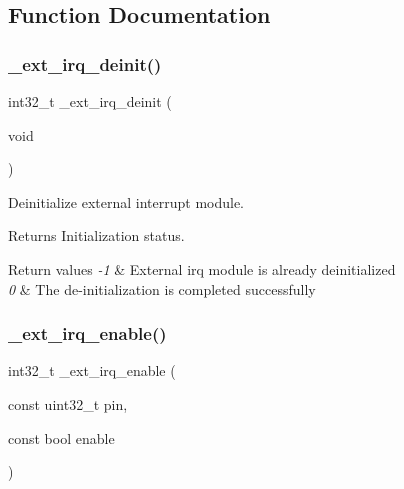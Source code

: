 \subsection{Function Documentation}
\mbox{\label{group___h_p_l_gad29f685cb658b260303c55fb7a88cdb0}} 
\subsubsection{\texorpdfstring{\+\_\+ext\+\_\+irq\+\_\+deinit()}{\_ext\_irq\_deinit()}}
{\footnotesize\ttfamily int32\+\_\+t \+\_\+ext\+\_\+irq\+\_\+deinit (\begin{DoxyParamCaption}\item[{void}]{ }\end{DoxyParamCaption})}



Deinitialize external interrupt module. 

\begin{DoxyReturn}{Returns}
Initialization status. 
\end{DoxyReturn}

\begin{DoxyRetVals}{Return values}
{\em -\/1} & External irq module is already deinitialized \\
\hline
{\em 0} & The de-\/initialization is completed successfully \\
\hline
\end{DoxyRetVals}
\mbox{\label{group___h_p_l_gac2fa4b43da6356425b0188b744b6f4cc}} 
\subsubsection{\texorpdfstring{\+\_\+ext\+\_\+irq\+\_\+enable()}{\_ext\_irq\_enable()}}
{\footnotesize\ttfamily int32\+\_\+t \+\_\+ext\+\_\+irq\+\_\+enable (\begin{DoxyParamCaption}\item[{const uint32\+\_\+t}]{pin,  }\item[{const bool}]{enable }\end{DoxyParamCaption})}



